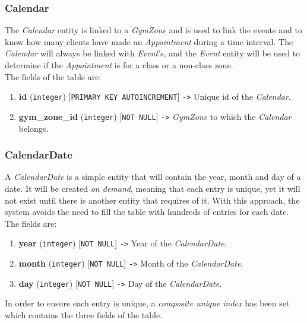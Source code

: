 \documentclass[a4paper, 12pt, oneside]{book}
\begin{document}
\subsubsection{Calendar}
The \emph{Calendar} entity is linked to a \emph{GymZone} and is used to link the events and to know how many clients have made an \emph{Appointment} during a time interval. The \emph{Calendar} will always be linked with \emph{Event}'s, and the \emph{Event} entity will be used to determine if the \emph{Appointment} is for a class or a non-class zone.
\\[8pt]
The fields of the table are:
\begin{enumerate}[label = -]
	\item \textbf{id} (\texttt{integer}) [\texttt{PRIMARY KEY AUTOINCREMENT}] \texttt{->} Unique id of the \emph{Calendar}.
	\item \textbf{gym\_zone\_id} (\texttt{integer}) [\texttt{NOT NULL}] \texttt{->} \emph{GymZone} to which the \emph{Calendar} belongs.
\end{enumerate}
\subsubsection{CalendarDate}
A \emph{CalendarDate} is a simple entity that will contain the year, month and day of a date. It will be created \emph{on demand}, meaning that each entry is unique, yet it will not exist until there is another entity that requires of it. With this approach, the system avoids the need to fill the table with hundreds of entries for each date. The fields are:
\begin{enumerate}[label = -]
	\item \textbf{year} (\texttt{integer}) [\texttt{NOT NULL}] \texttt{->} Year of the \emph{CalendarDate}.
	\item \textbf{month} (\texttt{integer}) [\texttt{NOT NULL}] \texttt{->} Month of the \emph{CalendarDate}.
	\item \textbf{day} (\texttt{integer}) [\texttt{NOT NULL}] \texttt{->} Day of the \emph{CalendarDate}.
\end{enumerate}
In order to ensure each entry is unique, a \emph{composite unique index} has been set which contains the three fields of the table.
\end{document}
